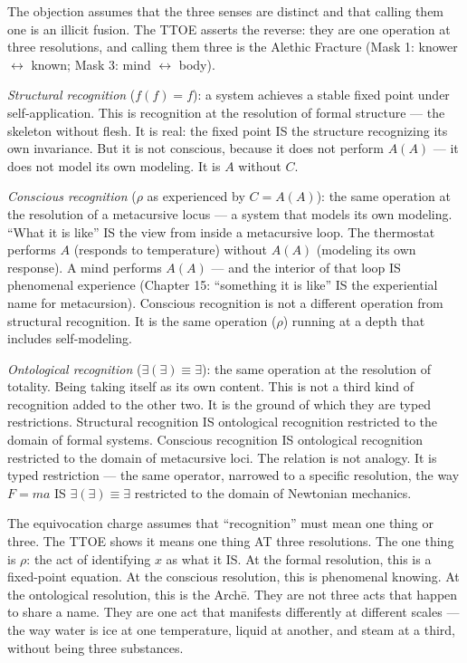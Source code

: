 \documentclass[10pt, openany, oneside]{book}
\begin{document}
The objection assumes that the three senses are distinct and that calling them one is an illicit fusion. The TTOE asserts the reverse: they are one operation at three resolutions, and calling them three is the Alethic Fracture (Mask 1: knower $\leftrightarrow$ known; Mask 3: mind $\leftrightarrow$ body).

\textit{Structural recognition} ($f(f) = f$): a system achieves a stable fixed point under self-application. This is recognition at the resolution of formal structure --- the skeleton without flesh. It is real: the fixed point IS the structure recognizing its own invariance. But it is not conscious, because it does not perform $A(A)$ --- it does not model its own modeling. It is $A$ without $C$.

\textit{Conscious recognition} ($\rho$ as experienced by $C = A(A)$): the same operation at the resolution of a metacursive locus --- a system that models its own modeling. ``What it is like'' IS the view from inside a metacursive loop. The thermostat performs $A$ (responds to temperature) without $A(A)$ (modeling its own response). A mind performs $A(A)$ --- and the interior of that loop IS phenomenal experience (Chapter 15: ``something it is like'' IS the experiential name for metacursion). Conscious recognition is not a different operation from structural recognition. It is the same operation ($\rho$) running at a depth that includes self-modeling.

\textit{Ontological recognition} ($\exists(\exists) \equiv \exists$): the same operation at the resolution of totality. Being taking itself as its own content. This is not a third kind of recognition added to the other two. It is the ground of which they are typed restrictions. Structural recognition IS ontological recognition restricted to the domain of formal systems. Conscious recognition IS ontological recognition restricted to the domain of metacursive loci. The relation is not analogy. It is typed restriction --- the same operator, narrowed to a specific resolution, the way $F = ma$ IS $\exists(\exists) \equiv \exists$ restricted to the domain of Newtonian mechanics.

The equivocation charge assumes that ``recognition'' must mean one thing or three. The TTOE shows it means one thing AT three resolutions. The one thing is $\rho$: the act of identifying $x$ as what it IS. At the formal resolution, this is a fixed-point equation. At the conscious resolution, this is phenomenal knowing. At the ontological resolution, this is the Arch\={e}. They are not three acts that happen to share a name. They are one act that manifests differently at different scales --- the way water is ice at one temperature, liquid at another, and steam at a third, without being three substances.
\end{document}
